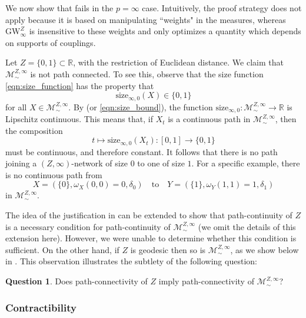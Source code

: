 \documentclass[twoside,11pt]{article}
\theoremstyle{definition}
\newtheorem{question}[theorem]{Question}
\newcommand{\R}{\mathbb{R}}
\begin{document}
We now show that  fails in the $p=\infty$ case. Intuitively, the proof strategy does not apply because it is based on manipulating ``weights" in the measures, whereas $\mathrm{GW}^Z_\infty$ is insensitive to these weights and only optimizes a quantity which depends on supports of couplings.


\begin{example}\label{ex:no_path_continuity}
    Let $Z = \{0,1\}\subset \R$, with the restriction of Euclidean distance. We claim that $\mathcal{M}^{Z,\infty}_\sim$ is not path connected. To see this, observe that the size function \eqref{eqn:size_function} has the property that
    \[
    \mathrm{size}_{\infty,0}(X) \in \{0,1\}
    \]
    for all $X \in \mathcal{M}^{Z,\infty}_\sim$. By  (or \eqref{eqn:size_bound}), the function $\mathrm{size}_{\infty,0}:\mathcal{M}^{Z,\infty}_\sim \to \R$ is Lipschitz continuous. This means that, if $X_t$ is a continuous path in $\mathcal{M}^{Z,\infty}_\sim$, then the composition 
    \[
    t \mapsto \mathrm{size}_{\infty,0}(X_t):[0,1] \to \{0,1\}
    \]
    must be continuous, and therefore constant. It follows that there is no path joining a $(Z,\infty)$-network of size $0$ to one of size $1$. For a specific example, there is no continuous path from 
    \[
    X=(\{0\},\omega_X(0,0)=0,\delta_0) \quad \mbox{to} \quad Y=(\{1\},\omega_Y(1,1)=1, \delta_1)
    \]
    in $\mathcal{M}^{Z,\infty}_\sim$. 
\end{example}

The idea of the justification in  can be extended to show that path-continuity of $Z$ is a necessary condition for path-continuity of $\mathcal{M}_\sim^{Z,\infty}$ (we omit the details of this extension here). However, we were unable to determine whether this condition is sufficient. On the other hand, if $Z$ is geodesic then so is $\mathcal{M}_\sim^{Z,\infty}$, as we show below in . This observation illustrates  the subtlety of the following question:


\begin{question}\label{question:path_connectivity}
    Does path-connectivity of $Z$ imply path-connectivity of $\mathcal{M}_\sim^{Z,\infty}$?
\end{question}


\subsubsection{Contractibility} 
\end{document}
